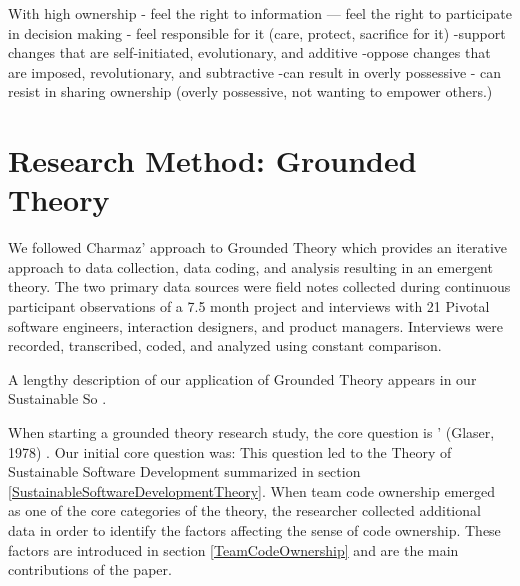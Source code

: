 With high ownership
- feel the right to information
— feel the right to participate in decision making
- feel responsible for it (care, protect, sacrifice for it)
-support changes that are self-initiated, evolutionary, and additive \cite{Dirks1996}
-oppose changes that are imposed, revolutionary, and subtractive
-can result in overly possessive 
- can resist in sharing ownership (overly possessive, not wanting to empower others.)





\section{Research Method: Grounded Theory}
\label{ResearchMethod}

We followed Charmaz' approach to Grounded Theory \cite{Charmaz} which provides an iterative approach to data collection, data coding, and analysis resulting in an emergent theory. The two primary data sources were field notes collected during continuous participant observations of a 7.5 month project and interviews with 21 Pivotal software engineers, interaction designers, and product managers. Interviews were recorded, transcribed, coded, and analyzed using constant comparison. 

A lengthy description of our application of Grounded Theory appears in our Sustainable So \cite{SustainableSoftwareDevelopment}.


When starting a grounded theory research study, the core question is ' (Glaser, 1978) \cite{GlaserTheoreticalSensitivity}. Our initial core question was:  This question led to the Theory of Sustainable Software Development summarized in section \ref{SustainableSoftwareDevelopmentTheory}. When team code ownership emerged as one of the core categories of the theory, the researcher collected additional data in order to identify the factors affecting the sense of code ownership. These factors are introduced in section \ref{TeamCodeOwnership} and are the main contributions of the paper.
